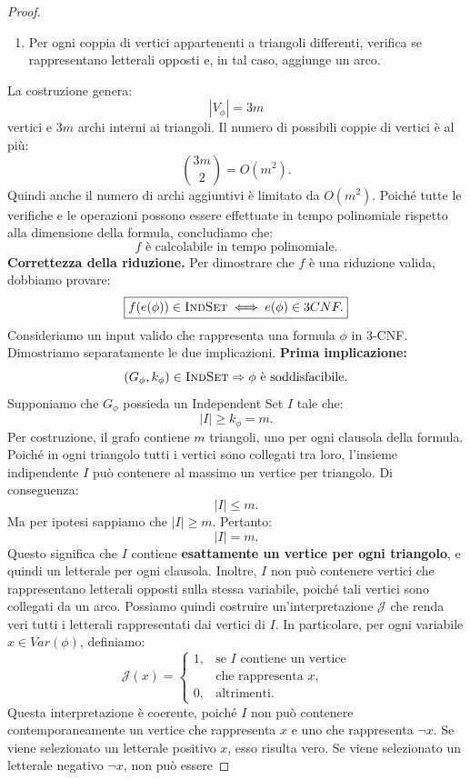 \begin{proof}
\begin{enumerate}
    \item Per ogni coppia di vertici
    appartenenti a triangoli differenti,
    verifica se rappresentano
    letterali opposti e, in tal caso,
    aggiunge un arco.
\end{enumerate}
La costruzione genera:
\[
|V_\phi|=3m
\]
vertici e $3m$ archi interni ai triangoli.
Il numero di possibili coppie di vertici
è al più:
\[
\binom{3m}{2}=O(m^2).
\]
Quindi anche il numero di archi
aggiuntivi è limitato da $O(m^2)$.
Poiché tutte le verifiche e le operazioni
possono essere effettuate in tempo
polinomiale rispetto alla dimensione
della formula, concludiamo che:
\[
\boxed{
f\text{ è calcolabile in tempo polinomiale}.
}
\]
\smallskip
\noindent
\textbf{Correttezza della riduzione.}
Per dimostrare che $f$ è una riduzione
valida, dobbiamo provare:
\[
\boxed{
f(e(\phi))\in \textsc{IndSet}
\iff
e(\phi)\in 3CNF.
}
\]
Consideriamo un input valido che rappresenta
una formula $\phi$ in $3$-CNF.
Dimostriamo separatamente le due implicazioni.
\medskip
\noindent
\textbf{Prima implicazione:}
\[
(G_\phi,k_\phi)\in \textsc{IndSet}
\Rightarrow
\phi\text{ è soddisfacibile}.
\]
Supponiamo che $G_\phi$ possieda un
Independent Set $I$ tale che:
\[
|I|\geq k_\phi=m.
\]
Per costruzione, il grafo contiene
$m$ triangoli, uno per ogni clausola
della formula.
Poiché in ogni triangolo tutti i vertici
sono collegati tra loro, l'insieme
indipendente $I$ può contenere
al massimo un vertice per triangolo.
Di conseguenza:
\[
|I|\leq m.
\]
Ma per ipotesi sappiamo che $|I|\geq m$.
Pertanto:
\[
\boxed{|I|=m.}
\]
Questo significa che $I$ contiene
\textbf{esattamente un vertice per ogni
triangolo}, e quindi un letterale
per ogni clausola.
Inoltre, $I$ non può contenere vertici
che rappresentano letterali opposti
sulla stessa variabile, poiché tali
vertici sono collegati da un arco.
Possiamo quindi costruire
un'interpretazione $\mathcal J$
che renda veri tutti i letterali
rappresentati dai vertici di $I$.
In particolare, per ogni variabile
$x\in Var(\phi)$, definiamo:
\[
\mathcal J(x)=
\begin{cases}
1, & \text{se }I\text{ contiene un vertice}\\
   & \text{che rappresenta }x,\\
0, & \text{altrimenti}.
\end{cases}
\]
Questa interpretazione è coerente,
poiché $I$ non può contenere
contemporaneamente un vertice che
rappresenta $x$ e uno che
rappresenta $\neg x$.
Se viene selezionato un letterale
positivo $x$, esso risulta vero.
Se viene selezionato un letterale
negativo $\neg x$, non può essere

\end{proof}
